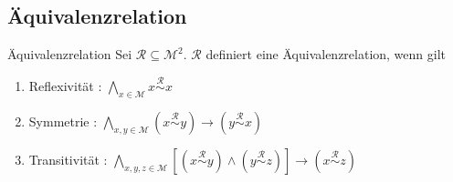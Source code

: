 \documentclass[]{beamer}
\begin{document}
\subsection{Äquivalenzrelation}
\begin{frame}[<+->][squeeze]{}
  \begin{block}{Äquivalenzrelation}
    Sei $\mathcal{R} \subseteq \mathcal{M}^2$. $\mathcal{R}$ definiert eine Äquivalenzrelation, wenn gilt
    \begin{enumerate}
      \item Reflexivität : \hspace{8pt} $\underset{x \in \mathcal{M}}{\bigwedge} x \overset{\mathcal{R}}{\sim} x$
      \item Symmetrie : \hspace{7pt} $\underset{x, y \in \mathcal{M}}{\bigwedge} (x \overset{\mathcal{R}}{\sim} y) \rightarrow (y \overset{\mathcal{R}}{\sim} x)$
      \item Transitivität : $\underset{x, y, z \in \mathcal{M}}{\bigwedge} [(x \overset{\mathcal{R}}{\sim} y) \land (y \overset{\mathcal{R}}{\sim} z)] \rightarrow (x \overset{\mathcal{R}}{\sim} z)$
    \end{enumerate}
  \end{block}
\end{frame}
\end{document}
